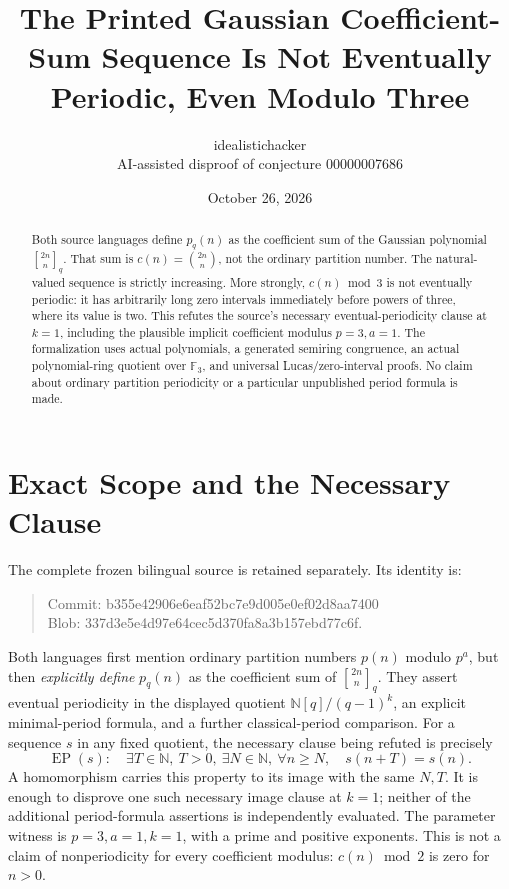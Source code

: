 \documentclass[11pt]{article}
\title{The Printed Gaussian Coefficient-Sum Sequence\newline
  Is Not Eventually Periodic, Even Modulo Three}
\author{idealistichacker\\\small AI-assisted disproof of conjecture 00000007686}
\date{October 26, 2026}
\newcommand{\N}{\mathbb N}
\newcommand{\F}{\mathbb F}
\begin{document}
\maketitle
\begin{abstract}
Both source languages define $p_q(n)$ as the coefficient sum of the Gaussian
polynomial ${2n\brack n}_q$. That sum is $c(n)=\binom{2n}{n}$, not the ordinary
partition number. The natural-valued sequence is strictly increasing.
More strongly, $c(n)\bmod3$ is not eventually periodic: it has arbitrarily
long zero intervals immediately before powers of three, where its value
is two. This refutes the source's necessary eventual-periodicity clause
at $k=1$, including the plausible implicit coefficient modulus
$p=3,a=1$. The formalization uses actual polynomials, a generated semiring
congruence, an actual polynomial-ring quotient over $\F_3$, and universal
Lucas/zero-interval proofs. No claim about ordinary partition periodicity
or a particular unpublished period formula is made.
\end{abstract}

\section{Exact Scope and the Necessary Clause}
The complete frozen bilingual source is retained separately. Its identity is:
\begin{quote}\small\ttfamily
Commit: b355e42906e6eaf52bc7e9d005e0ef02d8aa7400\\
Blob: 337d3e5e4d97e64cec5d370fa8a3b157ebd77c6f.
\end{quote}
Both languages first mention ordinary partition numbers $p(n)$ modulo $p^a$,
but then \emph{explicitly define} $p_q(n)$ as the coefficient sum of
${2n\brack n}_q$. They assert eventual periodicity in the displayed quotient
$\N[q]/(q-1)^k$, an explicit minimal-period formula, and a further
classical-period comparison. For a sequence $s$ in any fixed quotient, the
necessary clause being refuted is precisely
\[
 \operatorname{EP}(s):\quad
 \exists T\in\N,\ T>0,\ \exists N\in\N,\
 \forall n\ge N,\quad s(n+T)=s(n).
\]
A homomorphism carries this property to its image with the same $N,T$.
It is enough to disprove one such necessary image clause at $k=1$;
neither of the additional period-formula assertions is independently evaluated.
The parameter witness is $p=3,a=1,k=1$, with a prime and positive exponents.
This is not a claim of nonperiodicity for every coefficient modulus:
$c(n)\bmod2$ is zero for $n>0$.
\end{document}
